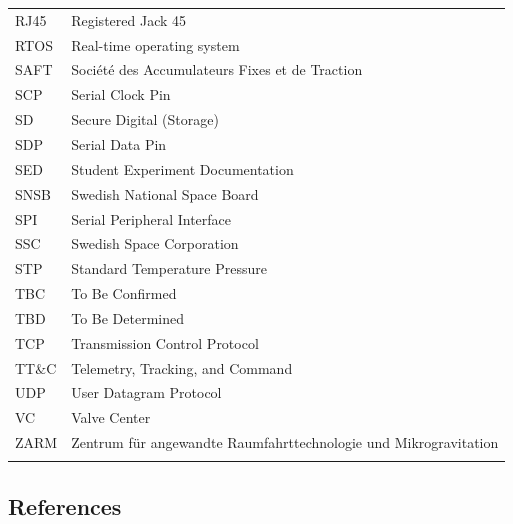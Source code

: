 \documentclass[a4paper,12pt,oneside]{article} %
\begin{document}
\begin{longtable}{p{3cm} p{9cm}}
            RJ45        & Registered Jack 45 \\
            RTOS        & Real-time operating system\\
            SAFT        & Soci\'{e}t\'{e} des Accumulateurs Fixes et de Traction\\
            SCP         & Serial Clock Pin\\
            SD          & Secure Digital (Storage) \\
            SDP         & Serial Data Pin\\
            SED         & Student Experiment Documentation \\
            SNSB        & Swedish National Space Board \\
            SPI         & Serial Peripheral Interface\\
            SSC         & Swedish Space Corporation \\
            STP         & Standard Temperature Pressure\\
            TBC         & To Be Confirmed\\
            TBD         & To Be Determined \\
            TCP         & Transmission Control Protocol\\
            TT$\&$C     & Telemetry, Tracking, and Command\\
            UDP         & User Datagram Protocol\\
            VC          & Valve Center\\ 
            ZARM        & Zentrum f{\"u}r angewandte Raumfahrttechnologie und Mikrogravitation \\            
        \label{tab:abbrevi}
    \end{longtable}
    \raggedbottom
\pagebreak
\subsection{References}
\end{document}
